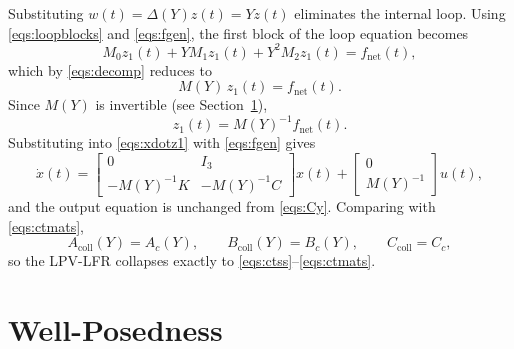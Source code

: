 \documentclass[11pt]{article}
\begin{document}
Substituting $w(t) = \Delta(Y)z(t) = Y z(t)$ eliminates the internal loop. Using
\eqref{eqs:loopblocks} and \eqref{eqs:fgen}, the first block of the loop
equation becomes
\begin{equation}
    M_0 z_1(t) + Y M_1 z_1(t) + Y^2 M_2 z_1(t) = f_{\mathrm{net}}(t),
    \label{eqs:collapsecollect}
\end{equation}
which by \eqref{eqs:decomp} reduces to
\begin{equation}
    M(Y)\,z_1(t) = f_{\mathrm{net}}(t).
    \label{eqs:collapseMY}
\end{equation}
Since $M(Y)$ is invertible (see Section~\ref{sec:wellposed}),
\begin{equation}
    z_1(t) = M(Y)^{-1} f_{\mathrm{net}}(t).
    \label{eqs:collapsevinv}
\end{equation}
Substituting into \eqref{eqs:xdotz1} with \eqref{eqs:fgen} gives
\begin{equation}
    \dot{x}(t)
    =
    \begin{bmatrix}
        0 & I_3 \\
        -M(Y)^{-1}K & -M(Y)^{-1}C
    \end{bmatrix}
    x(t)
    +
    \begin{bmatrix}
        0 \\
        M(Y)^{-1}
    \end{bmatrix}
    u(t),
    \label{eqs:recoverstate}
\end{equation}
and the output equation is unchanged from \eqref{eqs:Cy}. Comparing with
\eqref{eqs:ctmats},
\begin{equation}
    A_{\mathrm{coll}}(Y) = A_c(Y),
    \qquad
    B_{\mathrm{coll}}(Y) = B_c(Y),
    \qquad
    C_{\mathrm{coll}} = C_c,
    \label{eqs:collapsedequal}
\end{equation}
so the LPV-LFR collapses exactly to \eqref{eqs:ctss}--\eqref{eqs:ctmats}.

\section{Well-Posedness}
\label{sec:wellposed}
\end{document}
